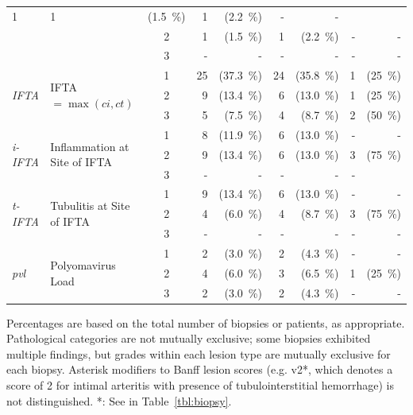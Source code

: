 \begin{table}[tbp]
{\begin{tabular}{ll c rr rr rr}
        1 & %
        1 & (1.5~\%) & 1 & (2.2~\%) & - & - 
        \\ & & 
        2 & %
        1 & (1.5~\%) & 1 & (2.2~\%) & - & - 
        \\ & & 
        3 & 
        - & - & - & - & - & - 
        \\\hline
        \multirow{3}{0.5in}{\emph{IFTA}} & 
        \multirow{3}{1.5in}{IFTA $= \max\left( ci, ct \right)$} & 
        1 & %
        25 & (37.3~\%) & 24 & (35.8~\%) & 1 & (25~\%)
        \\ & & 
        2 & %
        9 & (13.4~\%) & 6 & (13.0~\%) & 1 & (25~\%)
        \\ & & 
        3 & %
        5 & (7.5~\%) & 4 & (8.7~\%) & 2 & (50~\%)
        \\\hline
        \multirow{3}{0.5in}{\emph{i-IFTA}} & 
        \multirow{3}{1.5in}{Inflammation at \newline{}Site of IFTA} & 
        1 & %
        8 & (11.9~\%) & 6 & (13.0~\%) & - & - 
        \\ & & 
        2 & %
        9 & (13.4~\%) & 6 & (13.0~\%) & 3 & (75~\%)
        \\ & & 
        3 & 
        - & - & - & - & -
        \\\hline
        \multirow{3}{0.5in}{\emph{t-IFTA}} & 
        \multirow{3}{1.5in}{Tubulitis at \newline{}Site of IFTA} & 
        1 & %
        9 & (13.4~\%) & 6 & (13.0~\%) & - & - 
        \\ & & 
        2 & %
        4 & (6.0~\%) & 4 & (8.7~\%) & 3 & (75~\%)
        \\ & & 
        3 & 
        - & - & - & - & - & - 
        \\\hline
        \multirow{3}{0.5in}{\emph{pvl}} & 
        \multirow{3}{1.5in}{Polyomavirus Load} & 
        1 & %
        2 & (3.0~\%) & 2 & (4.3~\%) & - & - 
        \\ & & 
        2 & %
        4 & (6.0~\%) & 3 & (6.5~\%) & 1 & (25~\%)
        \\ & & 
        3 & %
        2 & (3.0~\%) & 2 & (4.3~\%) & - & - 
        \\\bottomrule
    \end{tabular}
    \par\vspace{0.5em}
    \noindent{}Percentages are based on the total number of biopsies or patients, as appropriate. Pathological categories are not mutually exclusive; some biopsies exhibited multiple findings, but grades within each lesion type are mutually exclusive for each biopsy. Asterisk modifiers to Banff lesion scores (e.g. v2*, which denotes a score of 2 for intimal arteritis with presence of tubulointerstitial hemorrhage) is not distinguished. *: See \textdagger{} in Table~\ref{tbl:biopsy}.
    }
    \label{tbl:banffScores}
\end{table}